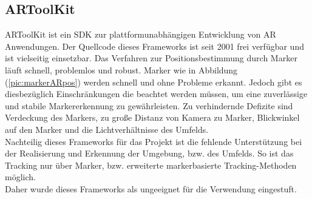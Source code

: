 \subsection{ARToolKit}
ARToolKit ist ein \acs{SDK} zur plattformunabhängigen Entwicklung von \acl{AR} Anwendungen. Der Quellcode dieses Frameworks ist seit 2001 
frei verfügbar und ist vielseitig einsetzbar. Das Verfahren zur Positionsbestimmung durch Marker läuft schnell, problemlos und robust. Marker wie in 
Abbildung (\ref{pic:markerARpos}) werden schnell und ohne Probleme erkannt. Jedoch gibt es diesbezüglich Einschränkungen die beachtet werden 
müssen, um eine zuverlässige und stabile Markererkennung zu gewährleisten. Zu verhindernde Defizite sind Verdeckung des Markers, zu große Distanz 
von Kamera zu Marker, Blickwinkel auf den Marker und die Lichtverhältnisse des Umfelds. 
\\ 
Nachteilig dieses Frameworks für das Projekt ist die fehlende Unterstützung bei der Realisierung und Erkennung der Umgebung, bzw. des Umfelds.
So ist das Tracking nur über Marker, bzw. erweiterte markerbasierte Tracking-Methoden möglich. 
\\ %
Daher wurde dieses Frameworks als ungeeignet für die Verwendung eingestuft. 
